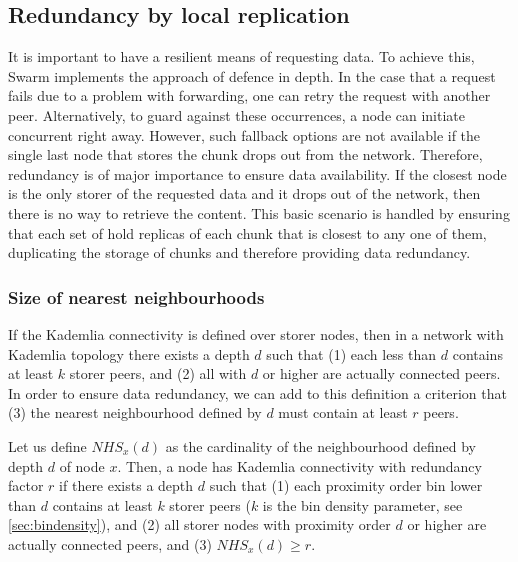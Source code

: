 \subsection{Redundancy by local replication\statusgreen}\label{sec:redundancy-by-local-replication}

It is important to have a resilient means of requesting data. To achieve this, Swarm implements the approach of defence in depth. In the case that a request fails due to a problem with forwarding, one can retry the request with another peer. Alternatively, to guard against these occurrences, a node can initiate concurrent  right away. However, such fallback options are not available if the single last node that stores the chunk drops out from the network. Therefore, redundancy is of major importance to ensure data availability. If the closest node is the only storer of the requested data and it drops out of the network, then there is no way to retrieve the content. This basic scenario is handled by ensuring that each set of  hold replicas of each chunk that is closest to any one of them, duplicating the storage of chunks and therefore providing data redundancy. 

\subsubsection{Size of nearest neighbourhoods}

If the Kademlia connectivity is defined over storer nodes, then in a network with Kademlia topology there exists a depth $d$ such that (1) each  less than $d$ contains at least $k$ storer peers, and (2) all  with  $d$ or higher are actually connected peers. In order to ensure data redundancy, we can add to this definition a criterion that (3) the nearest neighbourhood defined by $d$ must contain at least $r$ peers.

Let us define  $\mathit{NHS}_x(d)$  as the cardinality of the neighbourhood defined by depth $d$ of node $x$. 
Then, a node has Kademlia connectivity with redundancy factor $r$ if there exists a depth $d$ such that (1) each proximity order bin lower than $d$ contains at least $k$ storer peers ($k$ is the bin density parameter, see \ref{sec:bindensity}), and (2) all storer nodes with proximity order $d$ or higher are actually connected peers, and (3) $\mathit{NHS}_x(d)\geq r$.

